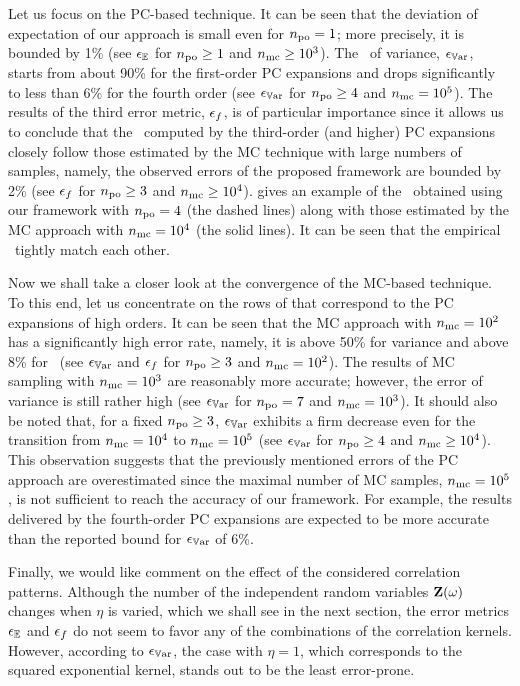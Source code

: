 Let us focus on the PC-based technique.
It can be seen that the deviation of expectation of our approach is small even for ${n_\text{po}} = 1$; more precisely, it is bounded by 1\% (see $\epsilon_\mathbb{E}$ for ${n_\text{po}} \geq 1$ and ${n_\text{mc}} \geq 10^3$).
The \nrmse\ of variance, $\epsilon_{\mathbb{V}\text{ar}}$, starts from about 90\% for the first-order PC expansions and drops significantly to less than 6\% for the fourth order (see $\epsilon_{\mathbb{V}\text{ar}}$ for ${n_\text{po}} \geq 4$ and ${n_\text{mc}} = 10^5$).
The results of the third error metric, $\epsilon_f$, is of particular importance since it allows us to conclude that the \pdfs\ computed by the third-order (and higher) PC expansions closely follow those estimated by the MC technique with large numbers of samples, namely, the observed errors of the proposed framework are bounded by 2\% (see $\epsilon_f$ for ${n_\text{po}} \geq 3$ and ${n_\text{mc}} \geq 10^4$).
 gives an example of the \pdfs\ obtained using our framework with ${n_\text{po}} = 4$ (the dashed lines) along with those estimated by the MC approach with ${n_\text{mc}} = 10^4$ (the solid lines).
It can be seen that the empirical \pdfs\ tightly match each other.

Now we shall take a closer look at the convergence of the MC-based technique. To this end, let us concentrate on the rows of  that correspond to the PC expansions of high orders.
It can be seen that the MC approach with ${n_\text{mc}} = 10^2$ has a significantly high error rate, namely, it is above 50\% for variance and above 8\% for \pdfs\ (see $\epsilon_{\mathbb{V}\text{ar}}$ and $\epsilon_f$ for ${n_\text{po}} \geq 3$ and ${n_\text{mc}} = 10^2$).
The results of MC sampling with ${n_\text{mc}} = 10^3$ are reasonably more accurate; however, the error of variance is still rather high (see $\epsilon_{\mathbb{V}\text{ar}}$ for ${n_\text{po}} = 7$ and ${n_\text{mc}} = 10^3$).
It should also be noted that, for a fixed ${n_\text{po}} \geq 3$, $\epsilon_{\mathbb{V}\text{ar}}$ exhibits a firm decrease even for the transition from ${n_\text{mc}} = 10^4$ to ${n_\text{mc}} = 10^5$ (see $\epsilon_{\mathbb{V}\text{ar}}$ for ${n_\text{po}} \geq 4$ and ${n_\text{mc}} \geq 10^4$).
This observation suggests that the previously mentioned errors of the PC approach are overestimated since the maximal number of MC samples, ${n_\text{mc}} = 10^5$, is not sufficient to reach the accuracy of our framework.
For example, the results delivered by the fourth-order PC expansions are expected to be more accurate than the reported bound for $\epsilon_{\mathbb{V}\text{ar}}$ of 6\%.

Finally, we would like comment on the effect of the considered correlation patterns.
Although the number of the independent random variables $\mathbf{Z}(\omega)$ changes when $\eta$ is varied, which we shall see in the next section, the error metrics $\epsilon_\mathbb{E}$ and $\epsilon_f$ do not seem to favor any of the combinations of the correlation kernels.
However, according to $\epsilon_{\mathbb{V}\text{ar}}$, the case with $\eta = 1$, which corresponds to the squared exponential kernel, stands out to be the least error-prone.

